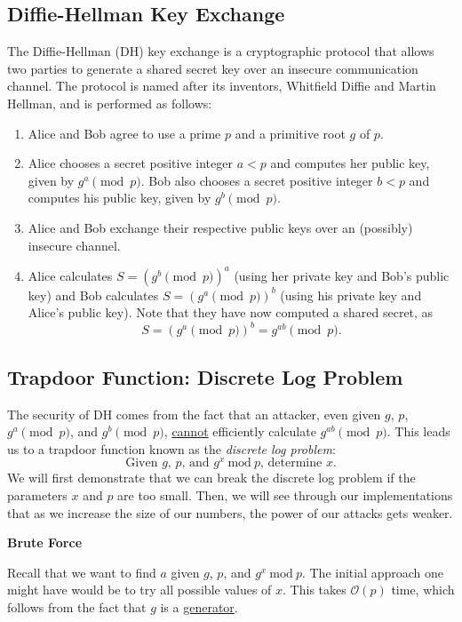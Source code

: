 \documentclass{article}
\begin{document}
\subsection*{Diffie-Hellman Key Exchange}
    The Diffie-Hellman (DH) key exchange is a cryptographic protocol that allows two parties to generate a shared secret key over an insecure communication channel. The protocol is named after its inventors, Whitfield Diffie and Martin Hellman, and is performed as follows:
    \begin{enumerate}[label = \arabic*.]
        \item Alice and Bob agree to use a prime $p$ and a primitive root $g$ of $p$.
        \item Alice chooses a secret positive integer $a < p$ and computes her public key, given by $g^{a} \pmod{p}$. Bob also chooses a secret positive integer $b < p$ and computes his public key, given by $g^{b} \pmod{p}$.
        \item Alice and Bob exchange their respective public keys over an (possibly) insecure channel.
        \item Alice calculates $S = (g^{b} \pmod{p})^{a}$ (using her private key and Bob's public key) and Bob calculates $S = (g^{a} \pmod{p})^{b}$ (using his private key and Alice's public key). Note that they have now computed a shared secret, as $$S = (g^{a} \pmod{p})^{b} = g^{ab} \pmod{p}.$$
    \end{enumerate}

\subsection*{Trapdoor Function: Discrete Log Problem}
    The security of DH comes from the fact that an attacker, even given $g$, $p$, $g^{a} \pmod{p}$, and $g^{b} \pmod{p}$, \underline{cannot} efficiently calculate $g^{ab} \pmod{p}$. This leads us to a trapdoor function known as the \textit{discrete log problem}: $$\text{Given $g$, $p$, and $g^{x}\ \text{mod}\ p$, determine $x$}.$$ We will first demonstrate that we can break the discrete log problem if the parameters $x$ and $p$ are too small. Then, we will see through our implementations that as we increase the size of our numbers, the power of our attacks gets weaker.

    \begin{center}
        \textbf{Brute Force}
    \end{center}

    Recall that we want to find $a$ given $g$, $p$, and $g^{x}\ \text{mod}\ p$. The initial approach one might have would be to try all possible values of $x$. This takes $\mathcal{O}(p)$ time, which follows from the fact that $g$ is a \href{https://en.wikipedia.org/wiki/Primitive_root_modulo_n}{generator}.
    
\end{document}
